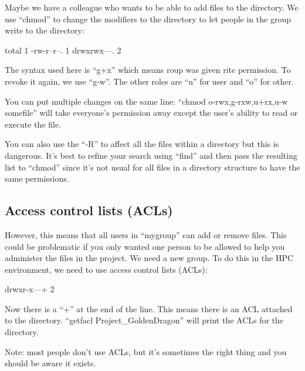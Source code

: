 Maybe we have a colleague who wants to be able to add files to the directory. We
use ``chmod'' to change the modifiers to the directory to let people in the
group write to the directory:

\begin{prompt}
total 1
-rw-r--r--. 1 %
drwxrwx---. 2 %
\end{prompt}

The syntax used here is ``g+x'' which means roup was given rite
permission. To revoke it again, we use ``g-w''. The other roles are ``u'' for
user and ``o'' for other.

You can put multiple changes on the same line: ``chmod o-rwx,g-rxw,u+rx,u-w
somefile'' will take everyone's permission away except the user's ability to
read or execute the file.

You can also use the ``-R'' to affect all the files within a directory but this
is dangerous. It's best to refine your search using ``find'' and then pass the
resulting list to ``chmod'' since it's not usual for all files in a directory
structure to have the same permissions.

\subsection{Access control lists (ACLs)}

However, this means that all users in ``mygroup'' can add or remove files. This
could be problematic if you only wanted one person to be allowed to help you
administer the files in the project. We need a new group. To do this in the HPC
environment, we need to use access control lists (ACLs):

\begin{prompt}
drwxr-x---+ 2 %
\end{prompt}

Now there is a ``+'' at the end of the line. This means there is an ACL attached
to the directory. ``getfacl Project_GoldenDragon'' will print the ACLs for the
directory.

Note: most people don't use ACLs, but it's sometimes the right thing and you
should be aware it exists.

